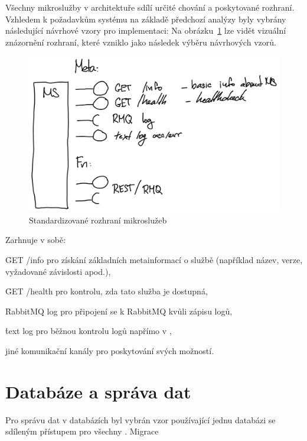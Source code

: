 Všechny mikroslužby v architektuře sdílí určité chování a poskytované rozhraní.
Vzhledem k požadavkům systému na základě předchozí analýzy byly vybrány následující návrhové vzory pro implementaci:
Na obrázku~\ref{fig:ms-template} lze vidět vizuální znázornění rozhraní, které vzniklo jako následek výběru návrhových vzorů.


\begin{figure}[htbp]
   \centering
   \includegraphics[max width=\textwidth]{assets/draft-ms-template}
   \caption{Standardizované rozhraní mikroslužeb}\label{fig:ms-template}
\end{figure}

Zarhnuje v sobě:

\begin{ul}
   \item \h{GET  /info} pro získání základních metainformací o službě (například název, verze, vyžadované závislosti apod.),
   \item \h{GET  /health} pro kontrolu, zda tato služba je dostupná,
   \item \h{RabbitMQ log} pro připojení se k RabbitMQ kvůli zápisu logů,
   \item \h{text log} pro běžnou kontrolu logů napřímo v ,
   \item jiné komunikační kanály pro poskytování svých možností.
\end{ul}



\section{Databáze a správa dat}\label{sec:server-db}

Pro správu dat v databázích byl vybrán vzor používající jednu databázi se sdíleným přístupem pro všechny .
Migrace


